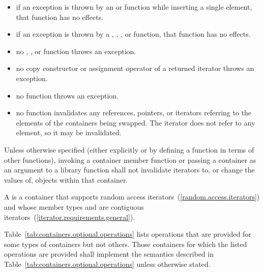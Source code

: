 \begin{itemize}
\item
if an exception is thrown by an
 or 
function while inserting a single element, that
function has no effects.
\item
if an exception is thrown by a
,
,
, or 
function, that function has no effects.
\item
no
,
,
or
function throws an exception.
\item
no copy constructor or assignment operator of a returned iterator
throws an exception.
\item
no
function throws an exception.
\item
no
function invalidates any references,
pointers, or iterators referring to the elements
of the containers being swapped. \enternote The  iterator does not refer to any element, so it may be invalidated. \exitnote
\end{itemize}

\pnum
Unless otherwise specified (either explicitly or by defining a
function in terms of other functions), invoking a container member
function or passing a container as an argument to a library function
shall not invalidate iterators to, or change the values of, objects
within that container.

\pnum
{}%
A 
is a container that supports random access iterators~(\ref{random.access.iterators})
and whose member types  and 
are contiguous iterators~(\ref{iterator.requirements.general}).

\pnum
Table~\ref{tab:containers.optional.operations} lists operations that are provided
for some types of containers but not others. Those containers for which the
listed operations are provided shall implement the semantics described in
Table~\ref{tab:containers.optional.operations} unless otherwise stated.

